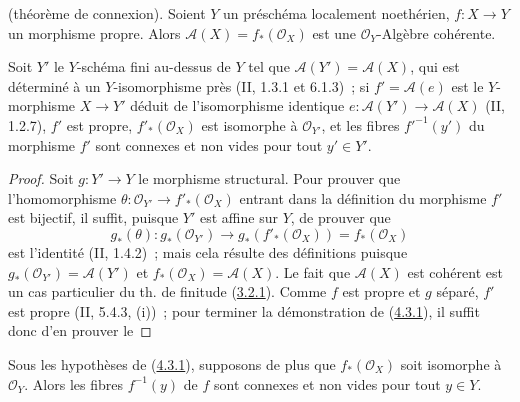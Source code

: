 \begin{theorem}[4.3.1]
\label{III.4.3.1-fr}
\textnormal{(théorème de connexion).}
Soient $Y$ un préschéma localement noethérien, $f:X\to Y$ un morphisme
propre. Alors $\mathcal A(X)=f_*(\mathcal O_X)$ est une
$\mathcal O_Y$-Algèbre cohérente.


Soit $Y'$ le $Y$-schéma fini au-dessus de $Y$ tel que
$\mathcal A(Y')=\mathcal A(X)$, qui est déterminé à un $Y$-isomorphisme
près (II, 1.3.1 et 6.1.3)~; si $f'=\mathcal A(e)$ est le $Y$-morphisme
$X\to Y'$ déduit de l'isomorphisme identique
$e:\mathcal A(Y')\to\mathcal A(X)$ (II, 1.2.7), $f'$ est propre,
$f'_*(\mathcal O_X)$ est isomorphe à $\mathcal O_{Y'}$, et les fibres
$f'^{-1}(y')$ du morphisme $f'$ sont connexes et non vides pour tout
$y'\in Y'$.
\end{theorem}

\begin{proof}
Soit $g:Y'\to Y$ le morphisme structural. Pour prouver que l'homomorphisme
$\theta:\mathcal O_{Y'}\to f'_*(\mathcal O_X)$ entrant dans la définition
du morphisme $f'$ est bijectif, il suffit, puisque $Y'$ est affine sur $Y$,
de prouver que
\[
g_*(\theta):g_*(\mathcal O_{Y'})\longrightarrow
g_*(f'_*(\mathcal O_X))=f_*(\mathcal O_X)
\]
est l'identité (II, 1.4.2)~; mais cela résulte des définitions puisque
$g_*(\mathcal O_{Y'})=\mathcal A(Y')$ et
$f_*(\mathcal O_X)=\mathcal A(X)$. Le fait que $\mathcal A(X)$ est
cohérent est un cas particulier du th. de finitude
(\hyperref[III.3.2.1-fr]{3.2.1}). Comme $f$ est propre et $g$ séparé,
$f'$ est propre (II, 5.4.3, (i))~; pour terminer la démonstration de
(\hyperref[III.4.3.1-fr]{4.3.1}), il suffit donc d'en prouver le
\end{proof}

\begin{corollary}[4.3.2]
\label{III.4.3.2-fr}
Sous les hypothèses de (\hyperref[III.4.3.1-fr]{4.3.1}), supposons de plus
que $f_*(\mathcal O_X)$ soit isomorphe à $\mathcal O_Y$. Alors les fibres
$f^{-1}(y)$ de $f$ sont connexes et non vides pour tout $y\in Y$.
\end{corollary}


